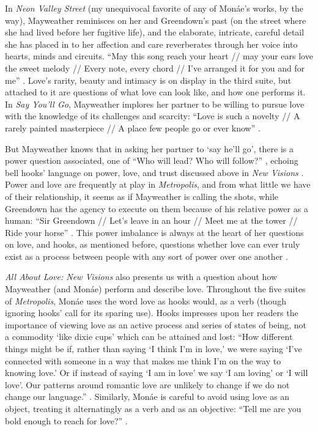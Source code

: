 \documentclass[a4paper, 11pt]{article} %
\begin{document}
In \emph{Neon Valley Street} (my unequivocal favorite of any of Mon\'ae's works, by the way), Mayweather reminisces on her and Greendown's past (on the street where she had lived before her fugitive life), and the elaborate, intricate, careful detail she has placed in to her affection and care reverberates through her voice into hearts, minds and circuits.
``May this song reach your heart // may your ears love the sweet melody // Every note, every chord // I've arranged it for you and for me'' \cite{neonvalleystreet}.
Love's rarity, beauty and intimacy is on display in the third suite, but attached to it are questions of what love can look like, and how one performs it.
In \emph{Say You'll Go}, Mayweather implores her partner to be willing to pursue love with the knowledge of its challenges and scarcity:
``Love is such a novelty // A rarely painted masterpiece // A place few people go or ever know'' \cite{sayyouwillgo}.

But Mayweather knows that in asking her partner to `say he'll go', there is a power question associated, one of ``Who will lead? Who will follow?''
 \cite{sayyouwillgo}, echoing bell hooks' language on power, love, and trust discussed above in \emph{New Visions} \cite{newvisions}.
Power and love are frequently at play in \emph{Metropolis}, and from what little we have of their relationship, it seems as if Mayweather is calling the shots, while Greendown has the agency to execute on them because of his relative power as a human: ``Sir Greendown // Let's leave in an hour // Meet me at the tower // Ride your horse'' \cite{greendown}.
This power imbalance is always at the heart of her questions on love, and hooks, as mentioned before, questions whether love can ever truly exist as a process between people with any sort of power over one another \cite{newvisions}.

\emph{All About Love: New Visions} also presents us with a question about how Mayweather (and Mon\'ae) perform and describe love.
Throughout the five suites of \emph{Metropolis}, Mon\'ae uses the word love as hooks would, as a verb (though ignoring hooks' call for its sparing use).
Hooks impresses upon her readers the importance of viewing love as an active process and series of states of being, not a commodity `like dixie cups' which can be attained and lost:
``How different things might be if, rather than saying `I think I'm in love,' we were saying `I've connected with someone in a way that makes me think I'm on the way to knowing love.' Or if instead of saying `I am in love' we say `I am loving' or `I will love'. Our patterns around romantic love are unlikely to change if we do not change our language.'' \cite{newvisions}.
Similarly, Mon\'ae is careful to avoid using love as an object, treating it alternatingly as a verb and as an objective: ``Tell me are you bold enough to reach for love?'' \cite{manymoons}.
\end{document}
